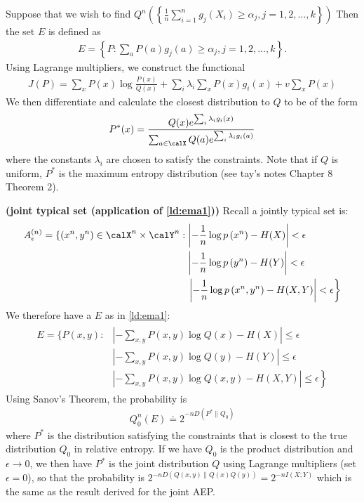 \documentclass{article}
\newcommand{\bfs}[1]{\textbf{({#1})}}
\begin{document}
\begin{exma}\label{ld:ema1}
Suppose that we wish to find $Q^n\left(\left\{\frac{1}{n} \sum_{i=1}^{n} g_{j}\left(X_{i}\right) \geq \alpha_{j}, j=1,2, \ldots, k\right\}\right)$
Then the set $E$ is defined as
\begin{align*}
E=\left\{P: \sum_{a} P(a) g_{j}(a) \geq \alpha_{j}, j=1,2, \ldots, k\right\} .
\end{align*}
Using Lagrange multipliers, we construct the functional
\begin{align*}
J(P)=\sum_{x} P(x) \log \frac{P(x)}{Q(x)}+\sum_{i} \lambda_{i} \sum_{x} P(x) g_{i}(x)+v \sum_{x} P(x)
\end{align*}
We then differentiate and calculate the closest distribution to $Q$ to be of the form
\begin{align*}
P^{*}(x)=\frac{Q(x) e^{\sum_{i} \lambda_{i} g_{i}(x)}}{\sum_{a \in \calX } Q(a) e^{\sum_{i} \lambda_{i} g_{i}(a)}}
\end{align*}
where the constants $\lambda_{i}$ are chosen to satisfy the constraints. Note that if $Q$ is uniform, $P^{*}$ is the maximum entropy distribution (see tay's notes Chapter 8 Theorem 2).
\end{exma}


\begin{exma}{\bfs{joint typical set (application of \cref{ld:ema1})}}
Recall a jointly typical set is:
\begin{align*}
\begin{aligned}
A_{\epsilon}^{(n)}=\left\{\left(x^{n}, y^{n}\right) \in \calX ^{n} \times \calY ^{n}:\right.&\left|-\frac{1}{n} \log p\left(x^{n}\right)-H(X)\right|<\epsilon \\
&\left|-\frac{1}{n} \log p\left(y^{n}\right)-H(Y)\right|<\epsilon \\
&\left.\left|-\frac{1}{n} \log p\left(x^{n}, y^{n}\right)-H(X, Y)\right|<\epsilon\right\}
\end{aligned}
\end{align*}
We therefore have a $E$ as in \cref{ld:ema1}:
\begin{align*}
\begin{aligned}
E=\{P(x, y):&\left|-\sum_{x, y} P(x, y) \log Q(x)-H(X)\right| \leq \epsilon \\
&\left|-\sum_{x, y} P(x, y) \log Q(y)-H(Y)\right| \leq \epsilon \\
&\left.\left|-\sum_{x, y} P(x, y) \log Q(x, y)-H(X, Y)\right| \leq \epsilon\right\}
\end{aligned}
\end{align*}
Using Sanov's Theorem, the probability is
\begin{align*}
Q_{0}^{n}(E) \doteq 2^{-n D\left(P^{*} \| Q_{0}\right)}
\end{align*}
where $P^{*}$ is the distribution satisfying the constraints that is closest to the true distribution $Q_{0}$ in relative entropy. If we have $Q_{0}$ is the product distribution and $\epsilon \rightarrow 0$, we then have $P^{*}$ is the joint distribution $Q$ using Lagrange multipliers (set $\epsilon =0$),  so that the probability is $2^{-n D(Q(x, y) \| Q(x) Q(y))}=2^{-n I(X ; Y)}$ which is the same as the result derived for the joint AEP.
\end{exma}
\end{document}

